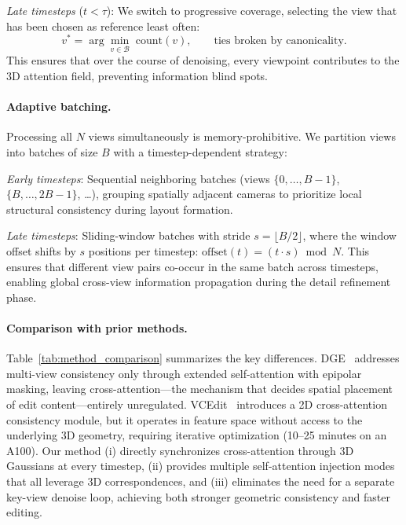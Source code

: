 \textit{Late timesteps} ($t < \tau$): We switch to progressive coverage, selecting the view that has been chosen as reference least often:
\begin{equation}
v^* = \arg\min_{v \in \mathcal{B}} \;\mathrm{count}(v), \qquad \text{ties broken by canonicality}.
\label{eq:progressive}
\end{equation}
This ensures that over the course of denoising, every viewpoint contributes to the 3D attention field, preventing information blind spots.

\paragraph{Adaptive batching.}
Processing all $N$ views simultaneously is memory-prohibitive.
We partition views into batches of size $B$ with a timestep-dependent strategy:

\textit{Early timesteps}: Sequential neighboring batches (views $\{0,\ldots,B{-}1\}$, $\{B,\ldots,2B{-}1\}$, \ldots), grouping spatially adjacent cameras to prioritize local structural consistency during layout formation.

\textit{Late timesteps}: Sliding-window batches with stride $s = \lfloor B/2 \rfloor$, where the window offset shifts by $s$ positions per timestep:
$\mathrm{offset}(t) = (t \cdot s) \bmod N$.
This ensures that different view pairs co-occur in the same batch across timesteps, enabling global cross-view information propagation during the detail refinement phase.

\paragraph{Comparison with prior methods.}
Table~\ref{tab:method_comparison} summarizes the key differences.
DGE~\cite{chen_gaussianeditor_2024} addresses multi-view consistency only through extended self-attention with epipolar masking, leaving cross-attention---the mechanism that decides spatial placement of edit content---entirely unregulated.
VCEdit~\cite{wang_vcedit_2025} introduces a 2D cross-attention consistency module, but it operates in feature space without access to the underlying 3D geometry, requiring iterative optimization (10--25 minutes on an A100).
Our method (i) directly synchronizes cross-attention through 3D Gaussians at every timestep, (ii) provides multiple self-attention injection modes that all leverage 3D correspondences, and (iii) eliminates the need for a separate key-view denoise loop, achieving both stronger geometric consistency and faster editing.

